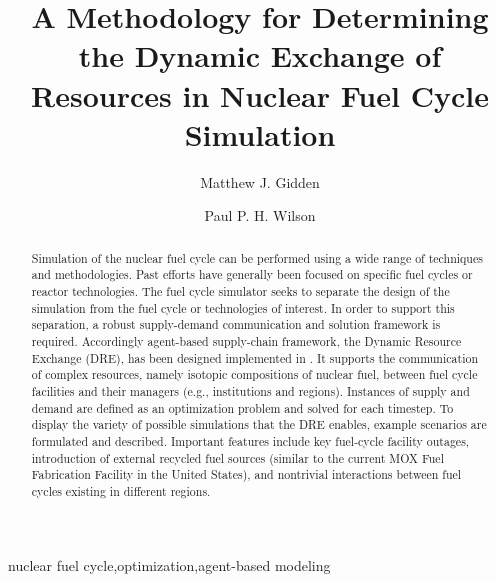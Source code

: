 

\begin{frontmatter}

\title{A Methodology for Determining the Dynamic Exchange of Resources in
  Nuclear Fuel Cycle Simulation}

\author[iiasa]{Matthew J. Gidden}
\address[iiasa]{International Institute for Applied Systems Analysis,
  Schlossplatz 1, A-2361 Laxenburg, Austria}
\author[uw]{Paul P. H. Wilson}
\address[uw]{University of Wisconsin - Madison, Department of Nuclear
  Engineering and Engineering Physics, Madison, WI 53706}

\begin{abstract}
Simulation of the nuclear fuel cycle can be performed using a wide range of
techniques and methodologies. Past efforts have generally been focused on
specific fuel cycles or reactor technologies. The \Cyclus fuel cycle simulator
seeks to separate the design of the simulation from the fuel cycle or
technologies of interest. In order to support this separation, a robust
supply-demand communication and solution framework is required. Accordingly
agent-based supply-chain framework, the Dynamic Resource Exchange (DRE), has
been designed implemented in \Cyclus. It supports the communication of complex
resources, namely isotopic compositions of nuclear fuel, between fuel cycle
facilities and their managers (e.g., institutions and regions). Instances of
supply and demand are defined as an optimization problem and solved for each
timestep. To display the variety of possible simulations that the DRE enables,
example scenarios are formulated and described. Important features include key
fuel-cycle facility outages, introduction of external recycled fuel sources
(similar to the current MOX Fuel Fabrication Facility in the United States), and
nontrivial interactions between fuel cycles existing in different regions.
\end{abstract}

\begin{keyword}
nuclear fuel cycle\sep  optimization\sep agent-based modeling
\end{keyword}

\end{frontmatter}

\linenumbers
